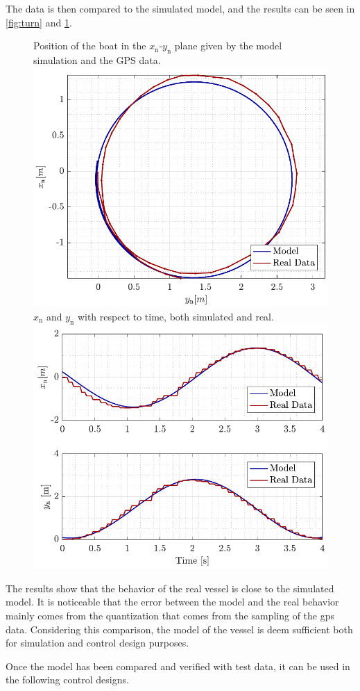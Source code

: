 The data is then compared to the simulated model, and the results can be seen in \autoref{fig:turn} and \ref{fig:turn_time}.

\begin{figure}[H]
    \captionbox 
    {   
        Position of the boat in the $x_\mathrm{n}$-$y_\mathrm{n}$ plane given by the model simulation and the GPS data.
        \label{fig:turn}
    }                                                                 
    {                                                                  
        \includegraphics[width=.45\textwidth]{figures/turn}         
    }                                                                    
    \hspace{5pt}                                                          
    \captionbox  
    {      
        $x_\mathrm{n}$ and $y_\mathrm{n}$ with respect to time, both simulated and real.
        \label{fig:turn_time}
    }                                                                          
    {
        \includegraphics[width=.45\textwidth]{figures/turn_time}
    }
\end{figure}

The results show that the behavior of the real vessel is close to the simulated model. It is noticeable that the error between the model and the  real behavior mainly comes from the quantization that comes from the sampling of the gps data. Considering this comparison, the model of the vessel is deem sufficient both for simulation and control design purposes. 


Once the model has been compared and verified with test data, it can be used in the following control designs.
